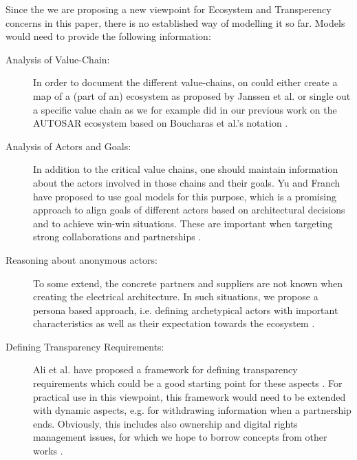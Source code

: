 Since the we are proposing a new viewpoint for Ecosystem and Transperency concerns in this paper, there is no established way of modelling it so far. 
Models would need to provide the following information:
\begin{description}
\item[Analysis of Value-Chain:] In order to document the different value-chains, on could either create a map of a (part of an) ecosystem as proposed by Janssen et al. \cite{Jansen2012b} or single out a specific value chain as we for example did in our previous work on the AUTOSAR ecosystem \cite{Soltani2015a} based on Boucharas et al.'s notation \cite{BJB2009}.
\item[Analysis of Actors and Goals:] In addition to the critical value chains, one should maintain information about the actors involved in those chains and their goals.
Yu and Franch have proposed to use goal models for this purpose, which is a promising approach to align goals of different actors based on architectural decisions and to achieve win-win situations. These are important when targeting strong collaborations and partnerships \cite{FSY2015}.
\item[Reasoning about anonymous actors:] To some extend, the concrete partners and suppliers are not known when creating the electrical architecture. 
In such situations, we propose a persona based approach, i.e. defining archetypical actors with important characteristics as well as their expectation towards the ecosystem \cite{Knauss2014c,Hammouda2015}.
\item[Defining Transparency Requirements:] Ali et al. have proposed a framework for defining transparency requirements which could be a good starting point for these aspects \cite{Ali}. For practical use in this viewpoint, this framework would need to be extended with dynamic aspects, e.g. for withdrawing information when a partnership ends. 
Obviously, this includes also ownership and digital rights management issues, for which we hope to borrow concepts from other works \cite{Muller,Averbakh2014}.
\end{description}


